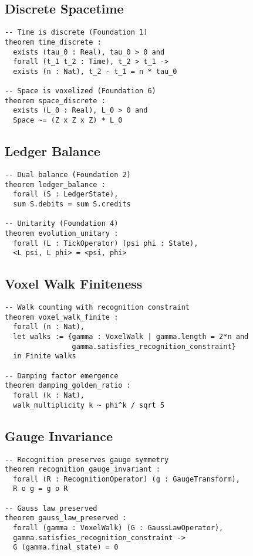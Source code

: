 \documentclass[11pt,a4paper]{article}
\theoremstyle{definition}
\theoremstyle{remark}
\begin{document}
\subsection{Discrete Spacetime}

\begin{verbatim}
-- Time is discrete (Foundation 1)
theorem time_discrete :
  exists (tau_0 : Real), tau_0 > 0 and
  forall (t_1 t_2 : Time), t_2 > t_1 -> 
  exists (n : Nat), t_2 - t_1 = n * tau_0

-- Space is voxelized (Foundation 6)
theorem space_discrete :
  exists (L_0 : Real), L_0 > 0 and
  Space ~= (Z x Z x Z) * L_0
\end{verbatim}

\subsection{Ledger Balance}

\begin{verbatim}
-- Dual balance (Foundation 2)
theorem ledger_balance :
  forall (S : LedgerState), 
  sum S.debits = sum S.credits

-- Unitarity (Foundation 4)
theorem evolution_unitary :
  forall (L : TickOperator) (psi phi : State),
  <L psi, L phi> = <psi, phi>
\end{verbatim}

\subsection{Voxel Walk Finiteness}

\begin{verbatim}
-- Walk counting with recognition constraint
theorem voxel_walk_finite :
  forall (n : Nat), 
  let walks := {gamma : VoxelWalk | gamma.length = 2*n and 
                gamma.satisfies_recognition_constraint}
  in Finite walks

-- Damping factor emergence
theorem damping_golden_ratio :
  forall (k : Nat),
  walk_multiplicity k ~ phi^k / sqrt 5
\end{verbatim}

\subsection{Gauge Invariance}

\begin{verbatim}
-- Recognition preserves gauge symmetry
theorem recognition_gauge_invariant :
  forall (R : RecognitionOperator) (g : GaugeTransform),
  R o g = g o R

-- Gauss law preserved
theorem gauss_law_preserved :
  forall (gamma : VoxelWalk) (G : GaussLawOperator),
  gamma.satisfies_recognition_constraint ->
  G (gamma.final_state) = 0
\end{verbatim}
\end{document}
